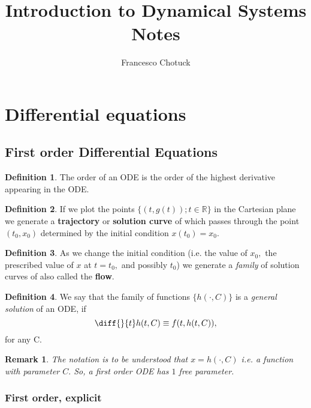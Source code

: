 \documentclass[12pt, a4paper]{article}
\title{Introduction to Dynamical Systems Notes}
\date{}
\author{Francesco Chotuck}
\newcommand{\bb}[1]{\mathbb{#1}}
\newtheorem*{remark}{Remark}
\theoremstyle{definition}
\newtheorem{definition}{Definition}[section]
\theoremstyle{plain}
\begin{document}
 
\maketitle 

\tableofcontents

\pagebreak

\section{Differential equations}

\subsection{First order Differential Equations}

\begin{definition}
The order of an ODE is the order of the highest derivative appearing in the ODE.
\end{definition}

\begin{definition}
If we plot the points $\{(t,g(t)); t \in \bb{R}\}$ in the Cartesian plane we generate a \textbf{trajectory} or \textbf{solution curve} of which passes through the point $(t_0,x_0)$ determined by the initial condition $x(t_0) = x_0.$
\end{definition}

\begin{definition}
As we change the initial condition (i.e. the value of $x_0,$ the prescribed value of $x$ at $t = t_0,$ and possibly $t_0$) we generate a \textit{family} of solution curves of also called the \textbf{flow}.
\end{definition}

\begin{definition}
We say that the family of functions $\{h(\cdot, C)\}$ is a \textit{general solution} of an ODE, if $$\diff{}{t}h(t, C) \equiv f(t, h(t,C)),$$ for any C.
\end{definition}

\begin{remark}
The notation is to be understood that $x=h(\cdot, C)$ i.e. a function with parameter $C.$ So, a first order ODE has $1$ free parameter.
\end{remark}

\subsubsection{First order, explicit}
\end{document}
